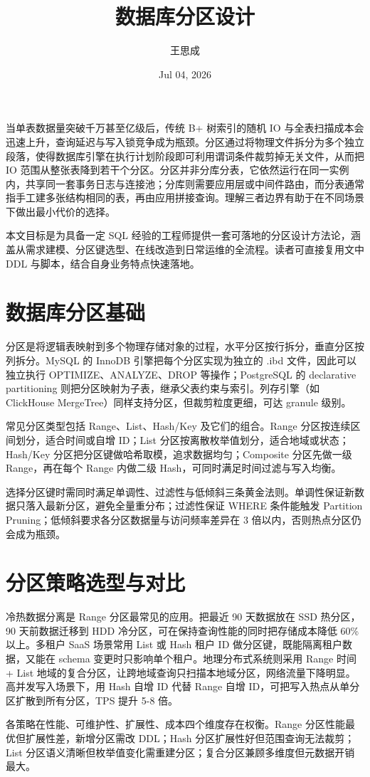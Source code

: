 \title{数据库分区设计}
\author{王思成}
\date{Jul 04, 2026}
\maketitle
当单表数据量突破千万甚至亿级后，传统 B+ 树索引的随机 IO 与全表扫描成本会迅速上升，查询延迟与写入锁竞争成为瓶颈。分区通过将物理文件拆分为多个独立段落，使得数据库引擎在执行计划阶段即可利用谓词条件裁剪掉无关文件，从而把 IO 范围从整张表降到若干个分区。分区并非分库分表，它依然运行在同一实例内，共享同一套事务日志与连接池；分库则需要应用层或中间件路由，而分表通常指手工建多张结构相同的表，再由应用拼接查询。理解三者边界有助于在不同场景下做出最小代价的选择。\par
本文目标是为具备一定 SQL 经验的工程师提供一套可落地的分区设计方法论，涵盖从需求建模、分区键选型、在线改造到日常运维的全流程。读者可直接复用文中 DDL 与脚本，结合自身业务特点快速落地。\par
\chapter{数据库分区基础}
分区是将逻辑表映射到多个物理存储对象的过程，水平分区按行拆分，垂直分区按列拆分。MySQL 的 InnoDB 引擎把每个分区实现为独立的 .ibd 文件，因此可以独立执行 OPTIMIZE、ANALYZE、DROP 等操作；PostgreSQL 的 declarative partitioning 则把分区映射为子表，继承父表约束与索引。列存引擎（如 ClickHouse MergeTree）同样支持分区，但裁剪粒度更细，可达 granule 级别。\par
常见分区类型包括 Range、List、Hash/Key 及它们的组合。Range 分区按连续区间划分，适合时间或自增 ID；List 分区按离散枚举值划分，适合地域或状态；Hash/Key 分区把分区键做哈希取模，追求数据均匀；Composite 分区先做一级 Range，再在每个 Range 内做二级 Hash，可同时满足时间过滤与写入均衡。\par
选择分区键时需同时满足单调性、过滤性与低倾斜三条黄金法则。单调性保证新数据只落入最新分区，避免全量重分布；过滤性保证 WHERE 条件能触发 Partition Pruning；低倾斜要求各分区数据量与访问频率差异在 3 倍以内，否则热点分区仍会成为瓶颈。\par
\chapter{分区策略选型与对比}
冷热数据分离是 Range 分区最常见的应用。把最近 90 天数据放在 SSD 热分区，90 天前数据迁移到 HDD 冷分区，可在保持查询性能的同时把存储成本降低 60\%{} 以上。多租户 SaaS 场景常用 List 或 Hash 租户 ID 做分区键，既能隔离租户数据，又能在 schema 变更时只影响单个租户。地理分布式系统则采用 Range 时间 + List 地域的复合分区，让跨地域查询只扫描本地域分区，网络流量下降明显。高并发写入场景下，用 Hash 自增 ID 代替 Range 自增 ID，可把写入热点从单分区扩散到所有分区，TPS 提升 5-8 倍。\par
各策略在性能、可维护性、扩展性、成本四个维度存在权衡。Range 分区性能最优但扩展性差，新增分区需改 DDL；Hash 分区扩展性好但范围查询无法裁剪；List 分区语义清晰但枚举值变化需重建分区；复合分区兼顾多维度但元数据开销最大。\par
